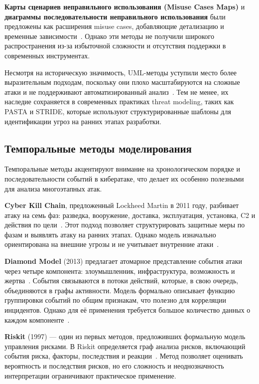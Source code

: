 \textbf{Карты сценариев неправильного использования (Misuse Cases Maps)} и \textbf{диаграммы последовательности неправильного использования} были предложены как расширения misuse cases, добавляющие детализацию и временные зависимости~\cite{Neiman2024a}. Однако эти методы не получили широкого распространения из-за избыточной сложности и отсутствия поддержки в современных инструментах.

Несмотря на историческую значимость, UML-методы уступили место более выразительным подходам, поскольку они плохо масштабируются на сложные атаки и не поддерживают автоматизированный анализ~\cite{Lallie2019}. Тем не менее, их наследие сохраняется в современных практиках threat modeling, таких как PASTA и STRIDE, которые используют структурированные шаблоны для идентификации угроз на ранних этапах разработки.

\subsection{Темпоральные методы моделирования}

Темпоральные методы акцентируют внимание на хронологическом порядке и последовательности событий в кибератаке, что делает их особенно полезными для анализа многоэтапных атак.

\textbf{Cyber Kill Chain}, предложенный Lockheed Martin в 2011 году, разбивает атаку на семь фаз: разведка, вооружение, доставка, эксплуатация, установка, C2 и действия по цели~\cite{Neiman2024b}. Этот подход позволяет структурировать защитные меры по фазам и выявлять атаку на ранних этапах. Однако модель изначально ориентирована на внешние угрозы и не учитывает внутренние атаки~\cite{Neiman2024b}.

\textbf{Diamond Model} (2013) предлагает атомарное представление события атаки через четыре компонента: злоумышленник, инфраструктура, возможность и жертва~\cite{Neiman2024b}. События связываются в потоки действий, которые, в свою очередь, объединяются в графы активности. Модель формально описывает функцию группировки событий по общим признакам, что полезно для корреляции инцидентов. Однако для её применения требуется большое количество данных о каждом компоненте~\cite{Neiman2024b}.

\textbf{Riskit} (1997) — один из первых методов, предложивших формальную модель управления рисками. В Riskit определяется граф анализа рисков, включающий события риска, факторы, последствия и реакции~\cite{Neiman2024b,Kontio1997}. Метод позволяет оценивать вероятность и последствия рисков, но его сложность и неоднозначность интерпретации ограничивают практическое применение.

